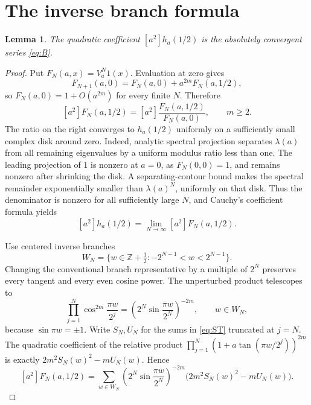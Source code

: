 \documentclass[11pt,a4paper]{article}
\newtheorem{lemma}[theorem]{Lemma}
\theoremstyle{remark}\newtheorem*{ednote}{Editorial note (ProveIt, 2026-10-01)}
\newcommand{\Z}{\mathbb Z}\newcommand{\T}{\mathbb T}\newcommand{\E}{\mathcal E}
\begin{document}
\section{The inverse branch formula}
\begin{lemma}\label{lem:orbit}
The quadratic coefficient $[a^2]h_a(1/2)$ is the absolutely convergent series \eqref{eq:B}.
\end{lemma}
\begin{proof}
Put $F_N(a,x)=V_a^N1(x)$. Evaluation at zero gives
\[
 F_{N+1}(a,0)=F_N(a,0)+a^{2m}F_N(a,1/2),
\]
so $F_N(a,0)=1+O(a^{2m})$ for every finite $N$. Therefore
\begin{equation}\label{eq:ratiojet}
 [a^2]F_N(a,1/2)=[a^2]\frac{F_N(a,1/2)}{F_N(a,0)},\qquad m\ge2.
\end{equation}
The ratio on the right converges to $h_a(1/2)$ uniformly on a sufficiently small complex disk around zero. Indeed, analytic spectral projection separates $\lambda(a)$ from all remaining eigenvalues by a uniform modulus ratio less than one. The leading projection of $1$ is nonzero at $a=0$, as $F_N(0,0)=1$, and remains nonzero after shrinking the disk. A separating-contour bound makes the spectral remainder exponentially smaller than $\lambda(a)^N$, uniformly on that disk. Thus the denominator is nonzero for all sufficiently large $N$, and Cauchy's coefficient formula yields
\begin{equation}\label{eq:limitjet}
 [a^2]h_a(1/2)=\lim_{N\to\infty}[a^2]F_N(a,1/2).
\end{equation}

Use centered inverse branches
\[
 W_N=\{w\in\Z+\tfrac12:-2^{N-1}<w<2^{N-1}\}.
\]
Changing the conventional branch representative by a multiple of $2^N$ preserves every tangent and every even cosine power. The unperturbed product telescopes to
\[
 \prod_{j=1}^N\cos^{2m}\frac{\pi w}{2^j}
   =\left(2^N\sin\frac{\pi w}{2^N}\right)^{-2m},\qquad w\in W_N,
\]
because $\sin\pi w=\pm1$. Write $S_N,U_N$ for the sums in \eqref{eq:ST} truncated at $j=N$. The quadratic coefficient of the relative product
$\prod_{j=1}^N(1+a\tan(\pi w/2^j))^{2m}$ is exactly
$2m^2S_N(w)^2-mU_N(w)$. Hence
\begin{equation}\label{eq:finite}
 [a^2]F_N(a,1/2)=\sum_{w\in W_N}
 \left(2^N\sin\frac{\pi w}{2^N}\right)^{-2m}
 \bigl(2m^2S_N(w)^2-mU_N(w)\bigr).
\end{equation}


\end{proof}
\end{document}
